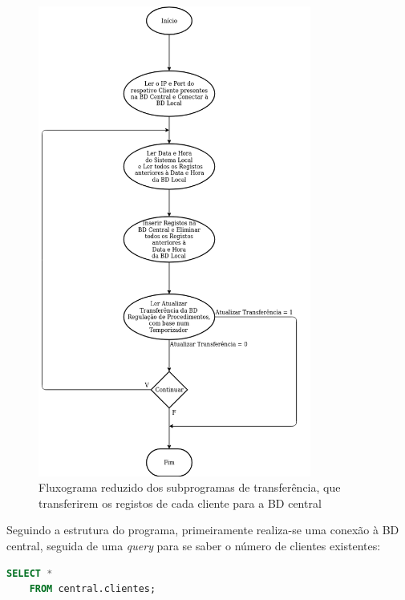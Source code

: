 \documentclass[11pt,twoside,a4paper]{report}
\begin{document}
\begin{figure}
	\vspace{-0.5cm}
	\begin{center}
		\includegraphics[width=0.8\textwidth]{fluxograma_simples_transferencia_subprograma01} %
		\caption[Fluxograma reduzido dos subprogramas de transferência]{Fluxograma reduzido dos subprogramas de transferência, que transferirem os registos de cada cliente para a BD central}
		\label{fig:transferencia_simples_subprograma}
	\end{center}
\end{figure}
Seguindo a estrutura do programa, primeiramente realiza-se uma conexão à BD central, seguida de uma \textit{query} para se saber o número de clientes existentes:
\begin{lstlisting}[language = SQL]
	SELECT *
	FROM central.clientes;
\end{lstlisting}
\end{document}

